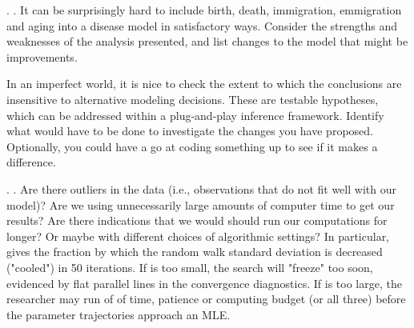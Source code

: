 \begin{frame}[fragile]

\myexercise. .
It can be surprisingly hard to include birth, death, immigration, emmigration and aging into a disease model in satisfactory ways. Consider the strengths and weaknesses of the analysis presented, and list changes to the model that might be improvements. 

In an imperfect world, it is nice to check the extent to which the conclusions are insensitive to alternative modeling decisions.  These are testable hypotheses, which can be addressed within a plug-and-play inference framework. Identify what would have to be done to investigate the changes you have proposed. Optionally, you could have a go at coding something up to see if it makes a difference.

\vspace{3mm}

\href{https://kingaa.github.io/sbied/polio/demography-exercise.html}{}

\end{frame}

\begin{frame}[fragile]

\myexercise. .
Are there outliers in the data (i.e., observations that do not fit well with our model)? Are we using unnecessarily large amounts of computer time to get our results? Are there indications that we would should run our computations for longer? Or maybe with different choices of algorithmic settings?
In particular,  gives the fraction by which the random walk standard deviation is decreased ("cooled") in 50 iterations. If  is too small, the search will "freeze" too soon, evidenced by flat parallel lines in the convergence diagnostics. If  is too large, the researcher may run of of time, patience or computing budget (or all three) before the parameter trajectories approach an MLE.

\vspace{3mm}

\href{https://kingaa.github.io/sbied/polio/convergence-exercise.html}{}

\end{frame}

